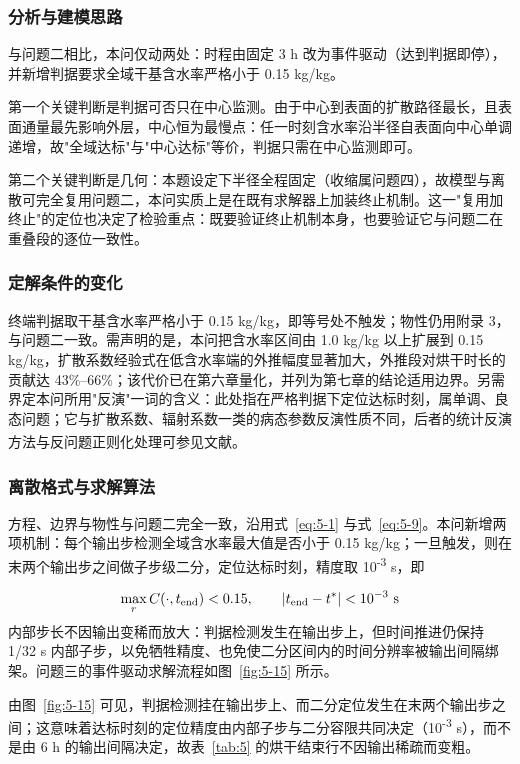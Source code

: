 \subsubsection{分析与建模思路}
与问题二相比，本问仅动两处：时程由固定 3 h 改为事件驱动（达到判据即停），并新增判据要求全域干基含水率严格小于 0.15 kg/kg。

第一个关键判断是判据可否只在中心监测。由于中心到表面的扩散路径最长，且表面通量最先影响外层，中心恒为最慢点：任一时刻含水率沿半径自表面向中心单调递增，故"全域达标"与"中心达标"等价，判据只需在中心监测即可。

第二个关键判断是几何：本题设定下半径全程固定（收缩属问题四），故模型与离散可完全复用问题二，本问实质上是在既有求解器上加装终止机制。这一"复用加终止"的定位也决定了检验重点：既要验证终止机制本身，也要验证它与问题二在重叠段的逐位一致性。

\subsubsection{定解条件的变化}
终端判据取干基含水率严格小于 0.15 kg/kg，即等号处不触发；物性仍用附录 3，与问题二一致。需声明的是，本问把含水率区间由 1.0 kg/kg 以上扩展到 0.15 kg/kg，扩散系数经验式在低含水率端的外推幅度显著加大，外推段对烘干时长的贡献达 43\%–66\%；该代价已在第六章量化，并列为第七章的结论适用边界。另需界定本问所用"反演"一词的含义：此处指在严格判据下定位达标时刻，属单调、良态问题；它与扩散系数、辐射系数一类的病态参数反演性质不同，后者的统计反演方法与反问题正则化处理可参见文献\textsuperscript{\cite{ref19,ref20}}。

\subsubsection{离散格式与求解算法}
方程、边界与物性与问题二完全一致，沿用式~\eqref{eq:5-1} 与式~\eqref{eq:5-9}。本问新增两项机制：每个输出步检测全域含水率最大值是否小于 0.15 kg/kg；一旦触发，则在末两个输出步之间做子步级二分，定位达标时刻，精度取 10\textsuperscript{-3} s，即

\begin{equation}
  \max_r C(\cdot,t_{\rm end})<0.15,\qquad |t_{\rm end}-t^{*}|<10^{-3}\ \mathrm s
  \label{eq:5-10}
\end{equation}
内部步长不因输出变稀而放大：判据检测发生在输出步上，但时间推进仍保持 1/32 s 内部子步，以免牺牲精度、也免使二分区间内的时间分辨率被输出间隔绑架。问题三的事件驱动求解流程如图~\ref{fig:5-15} 所示。

由图~\ref{fig:5-15} 可见，判据检测挂在输出步上、而二分定位发生在末两个输出步之间；这意味着达标时刻的定位精度由内部子步与二分容限共同决定（10\textsuperscript{-3} s），而不是由 6 h 的输出间隔决定，故表~\ref{tab:5} 的烘干结束行不因输出稀疏而变粗。

